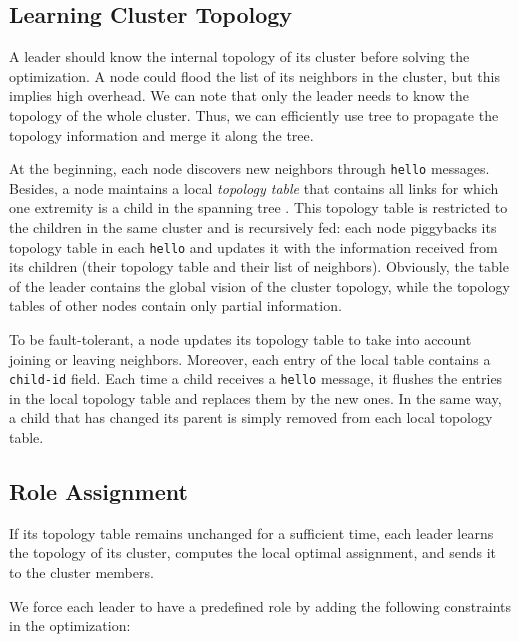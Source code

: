\documentclass[twoside]{article}
\begin{document}
\subsection{Learning Cluster Topology}

A leader should know the internal topology of its cluster before
solving the \milp optimization. A node could flood the list of its
neighbors in the cluster, but this implies high overhead. We can note
that only the leader needs to know the topology of the whole
cluster. Thus, we can efficiently use tree  to propagate the
topology information and merge it along the tree.

At the beginning, each node discovers new neighbors through \texttt{hello} messages. Besides, a node maintains a local \emph{topology table} that contains
all links for which one extremity is a child in the
spanning tree . This topology table is restricted to the
children in the same cluster and is recursively fed: each node
piggybacks its topology table in each \texttt{hello} and
updates it with the information received from its children (their
topology table and their list of neighbors). Obviously, the
table of the leader contains the global vision of the cluster
topology, while the topology tables of other nodes contain only
partial information.

To be fault-tolerant, a node updates its topology table to take
into account joining or leaving neighbors. Moreover, each entry of the
local table contains a \texttt{child-id} field. Each time a child
receives a \texttt{hello} message, it flushes the entries in the local
topology table and replaces them by the new ones. In the same way, a
child that has changed its parent is simply removed from each local
topology table.


\subsection{Role Assignment}
\label{subsection-role-assignment}


If its topology table remains unchanged for a sufficient time, each leader learns the topology of its cluster, computes the local optimal assignment, and sends it to the cluster members.



We force each leader to have a predefined role by adding the
following constraints in the \milp optimization:
\end{document}
